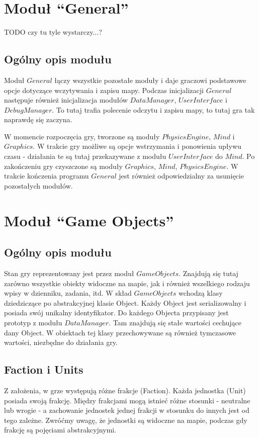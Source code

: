 \documentclass[licencjacka]{pracamgr}
\begin{document}
  \section{Moduł ``General''}
    TODO czy tu tyle wystarczy...?
    \subsection{Ogólny opis modułu}
      Moduł $General$ łączy wszystkie pozostałe moduły i daje graczowi podstawowe opcje dotyczące wczytywania i zapisu
      mapy. Podczas inicjalizacji $General$ następuje również inicjalizacja modułów $DataManager$, $UserInterface$ i
      $DebugManager$. To tutaj trafia polecenie odczytu i zapisu mapy, to tutaj gra tak naprawdę się zaczyna.

      W momencie rozpoczęcia gry, tworzone są moduły $PhysicsEngine$, $Mind$ i $Graphics$. W trakcie gry możliwe są
      opcje wstrzymania i ponowienia upływu czasu - działania te są tutaj przekazywane z modułu $UserInterface$ do
      $Mind$. Po zakończeniu gry czyszczone są moduły $Graphics$, $Mind$, $PhysicsEngine$. W trakcie kończenia programu
      $General$ jest również odpowiedzialny za usunięcie pozostałych modułów.

  \section{Moduł ``Game Objects''}
    \subsection{Ogólny opis modułu}
      Stan gry reprezentowany jest przez moduł $GameObjects$. Znajdują się tutaj zarówno wszystkie obiekty widoczne na
      mapie, jak i również wszelkiego rodzaju wpisy w dzienniku, zadania, itd. W skład $GameObjects$ wchodzą klasy
      dziedziczące po abstrakcyjnej klasie Object. Każdy Object jest serializowalny i posiada swój unikalny
      identyfikator. Do każdego Objecta przypisany jest prototyp z modułu $DataManager$. Tam znajdują się stałe
      wartości cechujące dany Object. W obiektach tej klasy przechowywane są również tymczasowe wartości, niezbędne
      do działania gry.

    \subsection{Faction i Units}
      Z założenia, w grze występują różne frakcje (Faction). Każda jednostka (Unit) posiada swoją frakcję. Między
      frakcjami mogą istnieć różne stosunki - neutralne lub wrogie - a zachowanie jednostek jednej frakcji w stosunku
      do innych jest od tego zależne. Zwróćmy uwagę, że jednostki są widoczne na mapie, podczas gdy frakcję są
      pojęciami abstrakcyjnymi.
\end{document}
